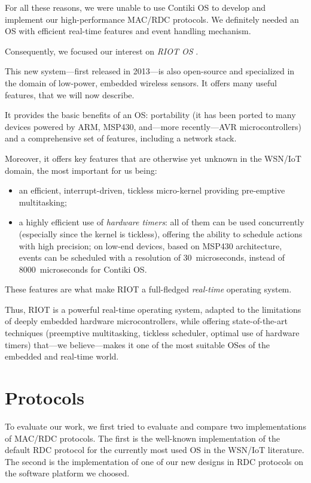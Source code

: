 \documentclass[conference]{IEEEtran}
\begin{document}
For all these reasons, we were unable to use Contiki OS to develop and
implement our high-performance MAC/RDC protocols. We definitely needed
an OS with efficient real-time features and event handling mechanism.

\bigskip

Consequently, we focused our interest on \emph{RIOT OS} \cite{RIOT}.

This new system---first released in 2013---is also open-source and
specialized in the domain of low-power, embedded wireless sensors.
It offers many useful features, that we will now describe.

It provides the basic benefits of an OS: portability (it has been ported
to many devices powered by ARM, MSP430, and---more recently---AVR
microcontrollers) and a comprehensive set of features, including
a network stack.

Moreover, it offers key features that are otherwise yet unknown in
the WSN/IoT domain, the most important for us being:
\begin{itemize}
\item an efficient, interrupt-driven, tickless micro-kernel providing
      pre-emptive multitasking;
\item a highly efficient use of \emph{hardware timers}: all of them can be
      used concurrently (especially since the kernel is tickless), offering
      the ability to schedule actions with high precision; on low-end
      devices, based on MSP430 architecture, events can be scheduled
      with a resolution of 30~microseconds, instead of 8000~microseconds
      for Contiki OS.
\end{itemize}
These features are what make RIOT a full-fledged \emph{real-time} operating
system.

Thus, RIOT is a powerful real-time operating system, adapted to the
limitations of deeply embedded hardware microcontrollers, while offering
state-of-the-art techniques (preemptive multitasking, tickless scheduler,
optimal use of hardware timers) that---we believe---makes it one of
the most suitable OSes of the embedded and real-time world.



\section{Protocols}
\label{SectProtoDescription}

To evaluate our work, we first tried to evaluate and compare two
implementations of MAC/RDC protocols. The first is the well-known
implementation of the default RDC protocol for the currently most used OS
in the WSN/IoT literature. The second is the implementation of one of our
new designs in RDC protocols on the software platform we choosed.
\end{document}
